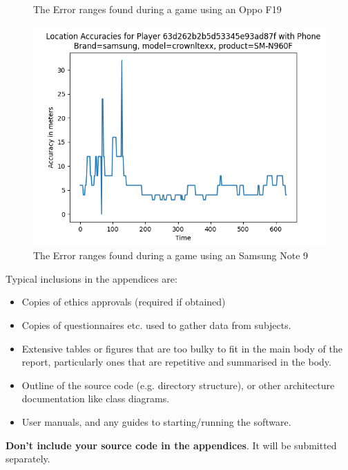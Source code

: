 \documentclass{l4proj}
\begin{document}
\begin{appendices}
\begin{figure}
    \caption{The Error ranges found during a game using an Oppo F19}
    \label{fig:oppo}
\end{figure}
\begin{figure}
    \centering
    \includegraphics[width=1.0\linewidth]{images/note9.png}
    \caption{The Error ranges found during a game using an Samsung Note 9}
    \label{fig:note9}
\end{figure}

Typical inclusions in the appendices are:

\begin{itemize}
\item
  Copies of ethics approvals (required if obtained)
\item
  Copies of questionnaires etc. used to gather data from subjects.
\item
  Extensive tables or figures that are too bulky to fit in the main body of
  the report, particularly ones that are repetitive and summarised in the body.

\item Outline of the source code (e.g. directory structure), or other architecture documentation like class diagrams.

\item User manuals, and any guides to starting/running the software.

\end{itemize}

\textbf{Don't include your source code in the appendices}. It will be
submitted separately.

\end{appendices}






\end{document}
